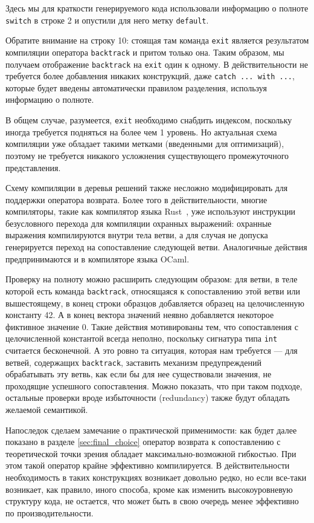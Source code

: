 Здесь мы для краткости генерируемого кода использовали информацию о полноте \lstinline|switch| в строке 2 и опустили для него метку \lstinline|default|.

Обратите внимание на строку 10: стоящая там команда \lstinline|exit| является результатом компиляции оператора \lstinline|backtrack| и притом только она. Таким образом, мы получаем отображение \lstinline|backtrack| на \lstinline|exit| один к одному. В действительности не требуется более добавления никаких конструкций, даже \lstinline[language=none]|catch ... with ...|, которые будет введены автоматически правилом разделения, используя информацию о полноте.

В общем случае, разумеется, \lstinline|exit| необходимо снабдить индексом, поскольку иногда требуется подняться на более чем 1 уровень. Но актуальная схема компиляции \cite{fessant2001optimizing} уже обладает такими метками (введенными для оптимизаций), поэтому не требуется никакого усложнения существующего промежуточного представления.

Схему компиляции в деревья решений также несложно модифицировать для поддержки оператора возврата. Более того в действительности, многие компиляторы, такие как компилятор языка Rust~\cite{rust_reference}, уже используют инструкции безусловного перехода для компиляции охранных выражений: охранные выражения компилируются внутри тела ветви, а для случая не допуска генерируется переход на сопоставление следующей ветви. Аналогичные действия предпринимаются и в компиляторе языка OCaml.

Проверку на полноту можно расширить следующим образом: для ветви, в теле которой есть команда \lstinline|backtrack|, относящаяся к сопоставлению этой ветви или вышестоящему, в конец строки образцов добавляется образец на целочисленную константу 42. А в конец вектора значений неявно добавляется некоторое фиктивное значение 0. Такие действия мотивированы тем, что сопоставления с целочисленной константой всегда неполно, поскольку сигнатура типа \lstinline|int| считается бесконечной. А это ровно та ситуация, которая нам требуется --- для ветвей, содержащих \lstinline|backtrack|, заставить механизм предупреждений \cite{maranget2007warnings} обрабатывать эту ветвь, как если бы для нее существовали значения, не проходящие успешного сопоставления. Можно показать, что при таком подходе, остальные проверки вроде избыточности (redundancy) также будут обладать желаемой семантикой.

Напоследок сделаем замечание о практической применимости: как будет далее показано в разделе \ref{sec:final_choice} оператор возврата к сопоставлению с теоретической точки зрения обладает максимально-возможной гибкостью. При этом такой оператор крайне эффективно компилируется. В действительности необходимость в таких конструкциях возникает довольно редко, но если все-таки возникает, как правило, иного способа, кроме как изменить высокоуровневую структуру кода, не остается, что может быть в свою очередь менее эффективно по производительности.

